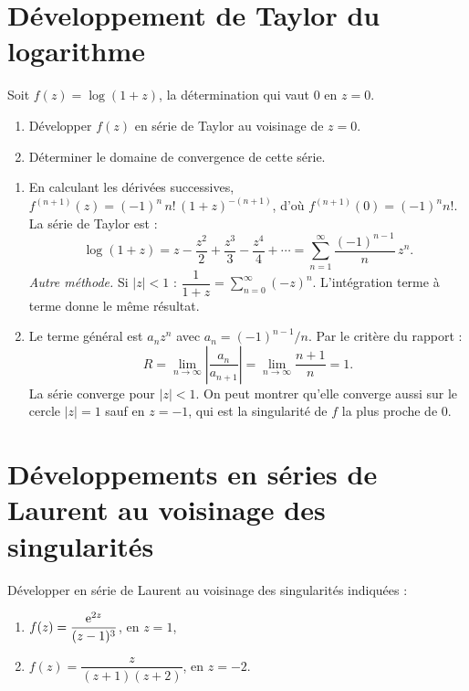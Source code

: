 \documentclass[12pt,a4paper]{article}
\begin{document}
\section{Développement de Taylor du logarithme}

\begin{boiteexercice}
\niveau{\moyen}
Soit $f(z) = \log(1+z)$, la détermination qui vaut $0$ en $z=0$.
\begin{enumerate}[label=\alph*)]
  \item Développer $f(z)$ en série de Taylor au voisinage de $z=0$.
  \item Déterminer le domaine de convergence de cette série.
\end{enumerate}
\end{boiteexercice}

\begin{boitecorrige}
\begin{enumerate}[label=\alph*)]
\item En calculant les dérivées successives, $f^{(n+1)}(z) = (-1)^n\,n!\,(1+z)^{-(n+1)}$, d'où $f^{(n+1)}(0) = (-1)^n n!$. La série de Taylor est :
\[
\log(1+z) = z - \frac{z^2}{2} + \frac{z^3}{3} - \frac{z^4}{4} + \cdots = \sum_{n=1}^{\infty}\frac{(-1)^{n-1}}{n}\,z^n.
\]
\textit{Autre méthode.} Si $|z|<1$ : $\dfrac{1}{1+z} = \sum_{n=0}^{\infty}(-z)^n$. L'intégration terme à terme donne le même résultat.

\item Le terme général est $a_n z^n$ avec $a_n = (-1)^{n-1}/n$. Par le critère du rapport :
\[
R = \lim_{n\to\infty}\left|\frac{a_n}{a_{n+1}}\right| = \lim_{n\to\infty}\frac{n+1}{n} = 1.
\]
La série converge pour $|z| < 1$. On peut montrer qu'elle converge aussi sur le cercle $|z|=1$ sauf en $z=-1$, qui est la singularité de $f$ la plus proche de $0$.
\end{enumerate}
\end{boitecorrige}

\section{Développements en séries de Laurent au voisinage des singularités}

\begin{boiteexercice}
\niveau{\moyen}
Développer en série de Laurent au voisinage des singularités indiquées :
\begin{enumerate}[label=\alph*)]
  \item $f(z) = \dfrac{\mathrm{e}^{2z}}{(z-1)^3}$, en $z=1$,
  \item $f(z) = \dfrac{z}{(z+1)(z+2)}$, en $z=-2$.
\end{enumerate}
\end{boiteexercice}
\end{document}
